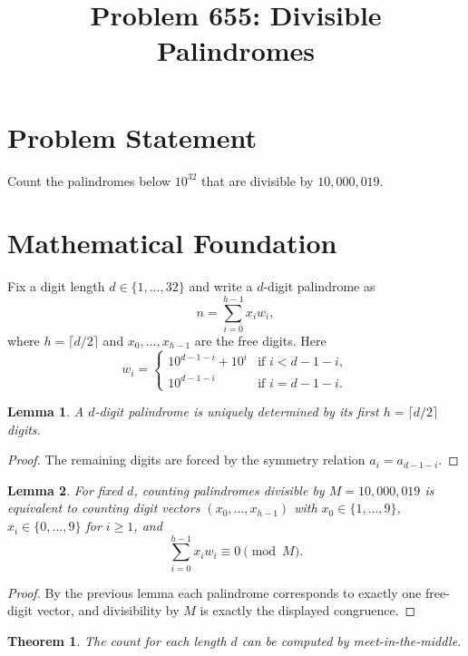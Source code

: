 \documentclass[11pt]{article}
\title{Problem 655: Divisible Palindromes}
\author{}
\date{}
\newtheorem{lemma}{Lemma}
\newtheorem{theorem}{Theorem}
\begin{document}
\maketitle

\section{Problem Statement}

Count the palindromes below $10^{32}$ that are divisible by $10{,}000{,}019$.

\section{Mathematical Foundation}

Fix a digit length $d \in \{1,\dots,32\}$ and write a $d$-digit palindrome as
\[
  n = \sum_{i=0}^{h-1} x_i w_i,
\]
where $h = \lceil d/2 \rceil$ and $x_0,\dots,x_{h-1}$ are the free digits. Here
\[
  w_i =
  \begin{cases}
    10^{d-1-i} + 10^i & \text{if } i < d-1-i,\\
    10^{d-1-i} & \text{if } i = d-1-i.
  \end{cases}
\]

\begin{lemma}
A $d$-digit palindrome is uniquely determined by its first $h=\lceil d/2\rceil$ digits.
\end{lemma}

\begin{proof}
The remaining digits are forced by the symmetry relation $a_i = a_{d-1-i}$.
\end{proof}

\begin{lemma}
For fixed $d$, counting palindromes divisible by $M=10{,}000{,}019$ is equivalent to counting digit vectors $(x_0,\dots,x_{h-1})$ with $x_0 \in \{1,\dots,9\}$, $x_i \in \{0,\dots,9\}$ for $i \ge 1$, and
\[
  \sum_{i=0}^{h-1} x_i w_i \equiv 0 \pmod M.
\]
\end{lemma}

\begin{proof}
By the previous lemma each palindrome corresponds to exactly one free-digit vector, and divisibility by $M$ is exactly the displayed congruence.
\end{proof}

\begin{theorem}
The count for each length $d$ can be computed by meet-in-the-middle.
\end{theorem}
\end{document}
